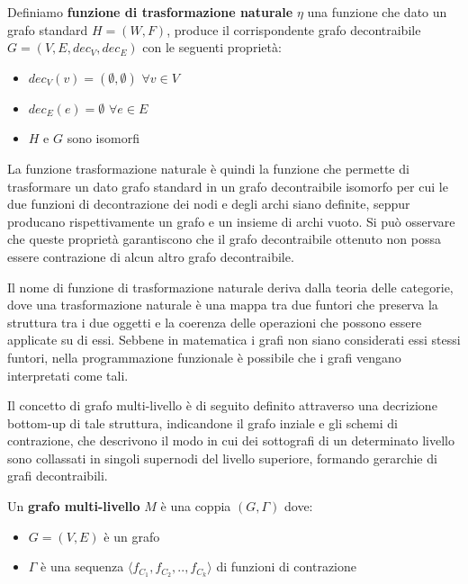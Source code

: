     \begin{definition} 
    Definiamo \textbf{funzione di trasformazione naturale} $\eta$ una funzione che dato un grafo standard
        $H=(W,F)$, produce il corrispondente grafo decontraibile $G = (V, E, dec_V, dec_E)$ con le seguenti propriet\`a:
        \begin{itemize}
            \item $dec_V(v) = (\emptyset, \emptyset)$ \quad $\forall v\in V$
            \item $dec_E(e) = \emptyset$ \quad $\forall e\in E$
            \item $H$ e $G$ sono isomorfi
        \end{itemize}
    \end{definition}

    La funzione trasformazione naturale \`e quindi la funzione che permette di trasformare un dato grafo standard in un
    grafo decontraibile isomorfo per cui le due funzioni di decontrazione dei nodi e degli archi siano definite,
    seppur producano rispettivamente un grafo e un insieme di archi vuoto. \newline
    Si pu\`o osservare che queste propriet\`a garantiscono che il grafo decontraibile ottenuto non possa essere
    contrazione di alcun altro grafo decontraibile. \newline

    Il nome di funzione di trasformazione naturale deriva dalla teoria delle categorie, dove una trasformazione
    naturale \`e una mappa tra due funtori che preserva la struttura tra i due oggetti e la coerenza delle operazioni
    che possono essere applicate su di essi. Sebbene in matematica i grafi non siano considerati essi stessi funtori,
    nella programmazione funzionale \`e possibile che i grafi vengano interpretati come tali. \newline

    \label{subsec:definzione-grafi_multilivello}

    Il concetto di grafo multi-livello \`e di seguito definito attraverso una decrizione bottom-up di tale struttura,
    indicandone il grafo inziale e gli schemi di contrazione, che descrivono il modo in cui dei sottografi di un
    determinato livello sono collassati in singoli supernodi del livello superiore, formando gerarchie di grafi
    decontraibili.

    \begin{definition}
    Un \textbf{grafo multi-livello} $M$ \`e una coppia $(G, \Gamma)$ dove:
        \begin{itemize}
            \item $G = (V, E)$ \`e un grafo
            \item $\Gamma$ \`e una sequenza $\langle f_{C_1}, f_{C_2}, .., f_{C_k} \rangle$ di funzioni di contrazione
        \end{itemize}
    \end{definition}

